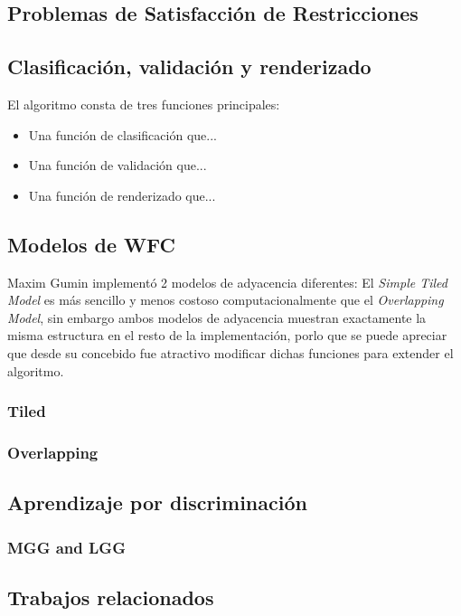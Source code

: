 \subsection{Problemas de Satisfacción de Restricciones}
\subsection{Clasificación, validación y renderizado}

El algoritmo consta de tres funciones principales:

\begin{itemize}
    \item Una función de clasificación que...
    \item Una función de validación que...
    \item Una función de renderizado que...
\end{itemize}

\subsection{Modelos de WFC}

Maxim Gumin implementó 2 modelos de adyacencia diferentes:
El \textit{Simple Tiled Model} es más sencillo y menos costoso
computacionalmente que el \textit{Overlapping Model}, sin embargo
ambos modelos de adyacencia muestran exactamente la misma estructura
en el resto de la implementación, porlo que se puede apreciar
que desde su concebido fue atractivo modificar dichas funciones
para extender el algoritmo.

\subsubsection{Tiled}
\subsubsection{Overlapping}

\subsection{Aprendizaje por discriminación}


\subsubsection{MGG and LGG}

\subsection{Trabajos relacionados}

